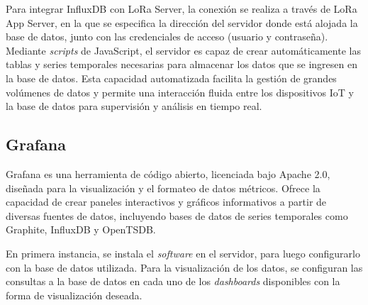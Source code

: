 Para integrar InfluxDB con LoRa Server, la conexión se realiza a través de LoRa App Server, en la que se especifica la dirección del servidor donde está alojada la base de datos, junto con las credenciales de acceso (usuario y contraseña). Mediante \emph{scripts} de JavaScript, el servidor es capaz de crear automáticamente las tablas y series temporales necesarias para almacenar los datos que se ingresen en la base de datos. Esta capacidad automatizada facilita la gestión de grandes volúmenes de datos y permite una interacción fluida entre los dispositivos IoT y la base de datos para supervisión y análisis en tiempo real.

\subsection{Grafana}

Grafana es una herramienta de código abierto, licenciada bajo Apache 2.0, diseñada para la visualización y el formateo de datos métricos. Ofrece la capacidad de crear paneles interactivos y gráficos informativos a partir de diversas fuentes de datos, incluyendo bases de datos de series temporales como Graphite, InfluxDB y OpenTSDB.

En primera instancia, se instala el \emph{software} en el servidor, para luego configurarlo con la base de datos utilizada. Para la visualización de los datos, se configuran las consultas a la base de datos en cada uno de los \emph{dashboards} disponibles con la forma de visualización deseada.
